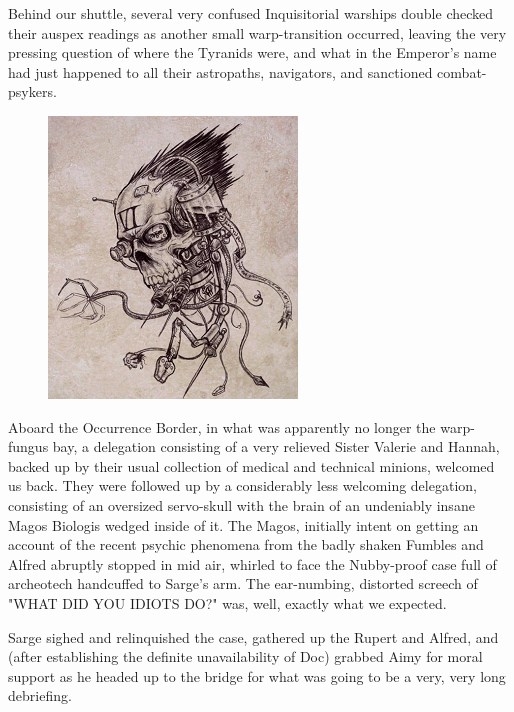 Behind our shuttle, several very confused Inquisitorial warships double checked their auspex readings as another small warp-transition occurred, leaving the very pressing question of where the Tyranids were, and what in the Emperor's name had just happened to all their astropaths, navigators, and sanctioned combat-psykers.

\begin{figure}
	\begin{center}
		\includegraphics[width=\figwidth]{pics/21/127.png}
	\end{center}
\end{figure}
Aboard the Occurrence Border, in what was apparently no longer the warp-fungus bay, a delegation consisting of a very relieved Sister Valerie and Hannah, backed up by their usual collection of medical and technical minions, welcomed us back. 
They were followed up by a considerably less welcoming delegation, consisting of an oversized servo-skull with the brain of an undeniably insane Magos Biologis wedged inside of it. 
The Magos, initially intent on getting an account of the recent psychic phenomena from the badly shaken Fumbles and Alfred abruptly stopped in mid air, whirled to face the Nubby-proof case full of archeotech handcuffed to Sarge's arm. 
The ear-numbing, distorted screech of "WHAT DID YOU IDIOTS DO?" was, well, exactly what we expected.

Sarge sighed and relinquished the case, gathered up the Rupert and Alfred, and (after establishing the definite unavailability of Doc) grabbed Aimy for moral support as he headed up to the bridge for what was going to be a very, very long debriefing.
